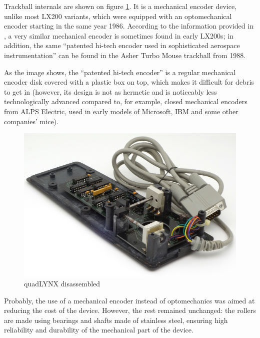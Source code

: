 \documentclass[11pt, a4paper]{article}
\begin{document}
Trackball internals are shown on figure \ref{fig:quadLYNXInside}. It is a mechanical encoder device, unlike most LX200 variants, which were equipped with an optomechanical encoder starting in the same year 1986. According to the information provided in \cite{lx200}, a very similar mechanical encoder is sometimes found in early LX200s; in addition, the same ``patented hi-tech encoder used in sophisticated aerospace instrumentation'' \cite{turbo} can be found in the Asher Turbo Mouse trackball from 1988. 

As the image shows, the ``patented hi-tech encoder'' is a regular mechanical encoder disk covered with a plastic box on top, which makes it difficult for debris to get in (however, its design is not as hermetic and is noticeably less technologically advanced compared to, for example, closed mechanical encoders from ALPS Electric, used in early models of Microsoft, IBM and some other companies' mice).

\begin{figure}[h]
    \centering
    \includegraphics[scale=0.6]{1986_honeywell_asher_quadlynx_trackball/inside_30.jpg}
    \caption{quadLYNX disassembled}
    \label{fig:quadLYNXInside}
\end{figure}

Probably, the use of a mechanical encoder instead of optomechanics was aimed at reducing the cost of the device. However, the rest remained unchanged: the rollers are made using bearings and shafts made of stainless steel, ensuring high reliability and durability of the mechanical part of the device.
\end{document}
